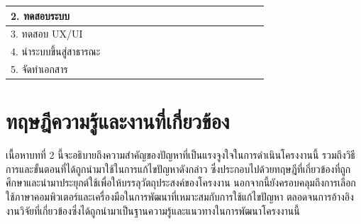 \documentclass[12pt,oneside,openright,a4paper]{cpe-thai-project}
\begin{document}
\begin{enumerate}
\begin{table}[h]
\begin{tabular}{|lllll|llll|llll|llll|llll|}
\multicolumn{5}{|l|}{2. ทดสอบระบบ} & \multicolumn{1}{l|}{} & \multicolumn{1}{l|}{} & \multicolumn{1}{l|}{} &  & \multicolumn{1}{l|}{} & \multicolumn{1}{l|}{} & \multicolumn{1}{l|}{} &  & \multicolumn{1}{l|}{\cellcolor[HTML]{C0C0C0}} & \multicolumn{1}{l|}{\cellcolor[HTML]{C0C0C0}} & \multicolumn{1}{l|}{\cellcolor[HTML]{C0C0C0}} & \cellcolor[HTML]{C0C0C0} & \multicolumn{1}{l|}{} & \multicolumn{1}{l|}{} & \multicolumn{1}{l|}{} & \cellcolor[HTML]{FFFFFF} \\ \hline
\multicolumn{5}{|l|}{3. ทดสอบ UX/UI} & \multicolumn{1}{l|}{} & \multicolumn{1}{l|}{} & \multicolumn{1}{l|}{} &  & \multicolumn{1}{l|}{} & \multicolumn{1}{l|}{} & \multicolumn{1}{l|}{} &  & \multicolumn{1}{l|}{\cellcolor[HTML]{C0C0C0}} & \multicolumn{1}{l|}{\cellcolor[HTML]{C0C0C0}} & \multicolumn{1}{l|}{\cellcolor[HTML]{C0C0C0}} & \cellcolor[HTML]{C0C0C0} & \multicolumn{1}{l|}{} & \multicolumn{1}{l|}{} & \multicolumn{1}{l|}{} & \cellcolor[HTML]{FFFFFF} \\ \hline
\multicolumn{5}{|l|}{4. นำระบบขึ้นสู่สาธารณะ} & \multicolumn{1}{l|}{} & \multicolumn{1}{l|}{} & \multicolumn{1}{l|}{} &  & \multicolumn{1}{l|}{} & \multicolumn{1}{l|}{} & \multicolumn{1}{l|}{} &  & \multicolumn{1}{l|}{} & \multicolumn{1}{l|}{} & \multicolumn{1}{l|}{} & \cellcolor[HTML]{C0C0C0} & \multicolumn{1}{l|}{} & \multicolumn{1}{l|}{} & \multicolumn{1}{l|}{} & \cellcolor[HTML]{FFFFFF} \\ \hline
\multicolumn{5}{|l|}{5. จัดทำเอกสาร} & \multicolumn{1}{l|}{} & \multicolumn{1}{l|}{} & \multicolumn{1}{l|}{} &  & \multicolumn{1}{l|}{} & \multicolumn{1}{l|}{} & \multicolumn{1}{l|}{} &  & \multicolumn{1}{l|}{} & \multicolumn{1}{l|}{} & \multicolumn{1}{l|}{} &  & \multicolumn{1}{l|}{\cellcolor[HTML]{C0C0C0}} & \multicolumn{1}{l|}{\cellcolor[HTML]{C0C0C0}} & \multicolumn{1}{l|}{\cellcolor[HTML]{C0C0C0}} & \cellcolor[HTML]{FFFFFF} \\ \hline
\end{tabular}
\end{table}
\end{enumerate}
\chapter{ทฤษฎีความรู้และงานที่เกี่ยวข้อง}

\hspace{2em}เนื้อหาบทที่ 2 นี้จะอธิบายถึงความสำคัญของปัญหาที่เป็นแรงจูงใจในการดำเนินโครงงานนี้ รวมถึงวิธีการและขั้นตอนที่ได้ถูกนำมาใช้ในการแก้ไขปัญหาดังกล่าว ซึ่งประกอบไปด้วยทฤษฎีที่เกี่ยวข้องที่ถูกศึกษาและนำมาประยุกต์ใช้เพื่อให้บรรลุวัตถุประสงค์ของโครงงาน นอกจากนี้ยังครอบคลุมถึงการเลือกใช้ภาษาคอมพิวเตอร์และเครื่องมือในการพัฒนาที่เหมาะสมกับการใช้แก้ไขปัญหา ตลอดจนการอ้างอิงงานวิจัยที่เกี่ยวข้องซึ่งได้ถูกนำมาเป็นฐานความรู้และแนวทางในการพัฒนาโครงงานนี้
\end{document}
